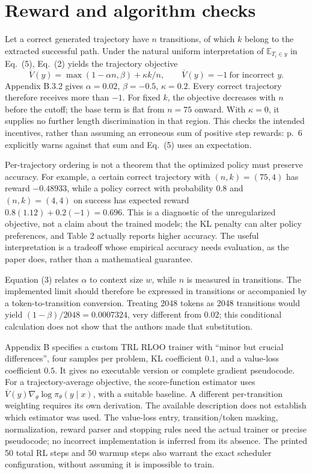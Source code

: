 \documentclass[10pt]{article}
\begin{document}
\section*{Reward and algorithm checks}
Let a correct generated trajectory have \(n\) transitions, of which \(k\) belong to the extracted successful path. Under the natural uniform interpretation of \(\mathbb E_{T_i\in y}\) in Eq. (5), Eq. (2) yields the trajectory objective \[\overline V(y)=\max(1-\alpha n,\beta)+\kappa k/n,
 \qquad \overline V(y)=-1\ \text{for incorrect }y.\] Appendix B.3.2 gives \(\alpha=0.02\), \(\beta=-0.5\), \(\kappa=0.2\). Every correct trajectory therefore receives more than \(-1\). For fixed \(k\), the objective decreases with \(n\) before the cutoff; the base term is flat from \(n=75\) onward. With \(\kappa=0\), it supplies no further length discrimination in that region. This checks the intended incentives, rather than assuming an erroneous sum of positive step rewards: p. 6 explicitly warns against that sum and Eq. (5) uses an expectation.\par
Per-trajectory ordering is not a theorem that the optimized policy must preserve accuracy. For example, a certain correct trajectory with \((n,k)=(75,4)\) has reward \(-0.48933\), while a policy correct with probability \(0.8\) and \((n,k)=(4,4)\) on success has expected reward \(0.8(1.12)+0.2(-1)=0.696\). This is a diagnostic of the unregularized objective, not a claim about the trained models; the KL penalty can alter policy preferences, and Table 2 actually reports higher accuracy. The useful interpretation is a tradeoff whose empirical accuracy needs evaluation, as the paper does, rather than a mathematical guarantee.\par
Equation (3) relates \(\alpha\) to context size \(w\), while \(n\) is measured in transitions. The implemented limit should therefore be expressed in transitions or accompanied by a token-to-transition conversion. Treating 2048 tokens as 2048 transitions would yield \((1-\beta)/2048=0.0007324\), very different from \(0.02\); this conditional calculation does not show that the authors made that substitution.\par
Appendix B specifies a custom TRL RLOO trainer with “minor but crucial differences”, four samples per problem, KL coefficient \(0.1\), and a value-loss coefficient \(0.5\). It gives no executable version or complete gradient pseudocode. For a trajectory-average objective, the score-function estimator uses \(\overline V(y)\nabla_\theta\log\pi_\theta(y\mid x)\), with a suitable baseline. A different per-transition weighting requires its own derivation. The available description does not establish which estimator was used. The value-loss entry, transition/token masking, normalization, reward parser and stopping rules need the actual trainer or precise pseudocode; no incorrect implementation is inferred from its absence. The printed 50 total RL steps and 50 warmup steps also warrant the exact scheduler configuration, without assuming it is impossible to train.\par
\end{document}
